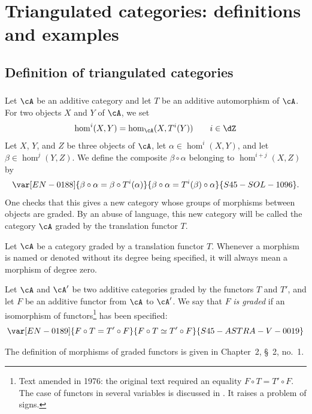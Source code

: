 \section{Triangulated categories: definitions and examples}\label{VIII:1}

\subsection{Definition of triangulated categories}\label{VIII:1-1}

\addtocounter{subsubsection}{-1}
\subsubsection{}\label{VIII:1-1-0}

Let $\cA$ be an additive category and let $T$ be an additive automorphism of
$\cA$. For two objects $X$ and $Y$ of $\cA$, we set
\[
  \hom^i(X,Y) = \hom_\cA(X,T^i(Y)) \qquad i\in \dZ
\]
Let $X$, $Y$, and $Z$ be three objects of $\cA$, let
$\alpha\in \hom^i(X,Y)$, and let $\beta\in \hom^j(Y,Z)$. We define the
composite $\beta\circ\alpha$ belonging to $\hom^{i+j}(X,Z)$ by
\[
  \var[EN-0188]{\beta\circ \alpha = \beta\circ T^i(\alpha)}{\beta\circ \alpha = T^i(\beta)\circ\alpha}{S45-SOL-1096} \text{.}
\]
One checks that this gives a new category whose groups of morphisms between
objects are graded. By an abuse of language, this new category will be called
the category $\cA$ graded by the translation functor $T$.

Let $\cA$ be a category graded by a translation functor $T$. Whenever a
morphism is named or denoted without its degree being specified, it will
always mean a morphism of degree zero.

Let $\cA$ and $\cA'$ be two additive categories graded by the functors $T$
and $T'$, and let $F$ be an additive functor from $\cA$ to $\cA'$. We say
that $F$ \emph{is graded} if an isomorphism of
functors\footnote{Text amended in 1976: the original text required an
equality $F\circ T=T'\circ F$. The case of functors in several variables is
discussed in . It raises a problem of signs.}
has been specified:
\[
  \var[EN-0189]{F\circ T = T'\circ F}{F\circ T \simeq T'\circ F}{S45-ASTRA-V-0019}
\]

The definition of morphisms of graded functors is given in
Chapter~2, \S~2, no.~1.

